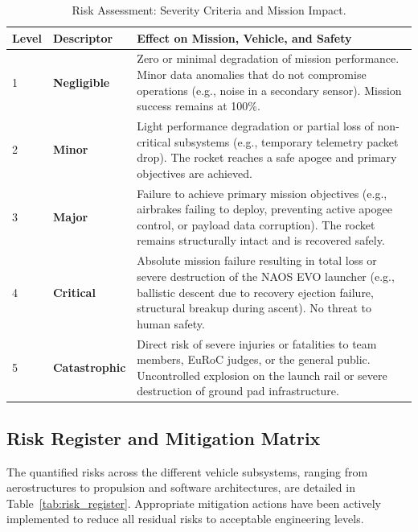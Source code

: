 \documentclass[11pt,a4paper]{article}
\begin{document}
\begin{table}[H]
    \centering
    \caption{Risk Assessment: Severity Criteria and Mission Impact.}
    \label{tab:severity_criteria}
    \vspace{0.2cm}
    \begin{tabularx}{\textwidth}{|>{\centering\arraybackslash}m{1.5cm}|>{\centering\arraybackslash}m{2.5cm}|X|}
        \hline
        \rowcolor{EtseNavy}
        \textbf{\color{white}Level} & \textbf{\color{white}Descriptor} & \textbf{\color{white}Effect on Mission, Vehicle, and Safety} \\ \hline
        \cellcolor{RiskGreen}1 & \textbf{Negligible} & Zero or minimal degradation of mission performance. Minor data anomalies that do not compromise operations (e.g., noise in a secondary sensor). Mission success remains at 100\%. \\ \hline
        \cellcolor{RiskGreen}2 & \textbf{Minor} & Light performance degradation or partial loss of non-critical subsystems (e.g., temporary telemetry packet drop). The rocket reaches a safe apogee and primary objectives are achieved. \\ \hline
        \cellcolor{RiskYellow}3 & \textbf{Major} & Failure to achieve primary mission objectives (e.g., airbrakes failing to deploy, preventing active apogee control, or payload data corruption). The rocket remains structurally intact and is recovered safely. \\ \hline
        \cellcolor{RiskOrange}4 & \textbf{Critical} & Absolute mission failure resulting in total loss or severe destruction of the NAOS EVO launcher (e.g., ballistic descent due to recovery ejection failure, structural breakup during ascent). No threat to human safety. \\ \hline
        \cellcolor{RiskRed}5 & \textbf{Catastrophic} & Direct risk of severe injuries or fatalities to team members, EuRoC judges, or the general public. Uncontrolled explosion on the launch rail or severe destruction of ground pad infrastructure. \\ \hline
    \end{tabularx}
\end{table}

\subsection{Risk Register and Mitigation Matrix}
The quantified risks across the different vehicle subsystems, ranging from aerostructures to propulsion and software architectures, are detailed in Table~\ref{tab:risk_register}. Appropriate mitigation actions have been actively implemented to reduce all residual risks to acceptable engineering levels.
\end{document}
